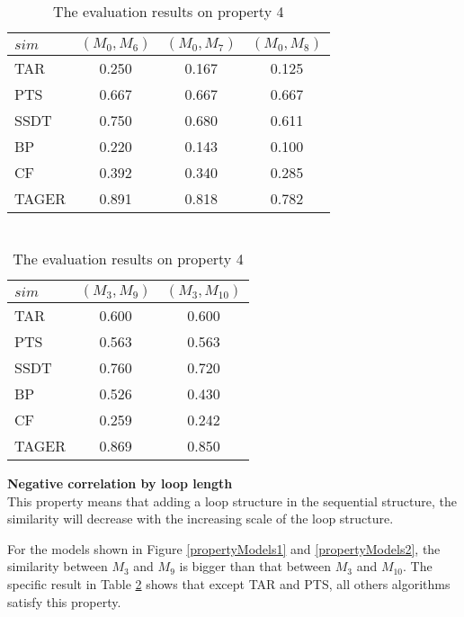 \documentclass{llncs}
\begin{document}
\begin{table}[!htb]
\begin{minipage}[t]{0.5\linewidth} 
\centering
\caption{ \protect\\ The evaluation results on property 3  \label{result_property3}}
\begin{tabular}{l c c c} \hline
 $sim$  & $(M_{0},M_{6})$ & $(M_{0},M_{7})$ & $(M_{0},M_{8})$ \\ \hline
 TAR & 0.250 & 0.167 & 0.125 \\ 
 PTS & 0.667 & 0.667 & 0.667 \\ 
 SSDT& 0.750 & 0.680 & 0.611 \\ 
 BP & 0.220 & 0.143 & 0.100 \\ 
 CF & 0.392 & 0.340 & 0.285\\ 
 TAGER& 0.891 & 0.818 & 0.782 \\ \hline
\end{tabular}
\end{minipage}
\begin{minipage}[t]{0.5\linewidth} 
\centering
\caption{ \protect\\ The evaluation results on property 4  \label{result_property4}}
\begin{tabular}{l c c} \hline
 $sim$  & $(M_{3},M_{9})$ & $(M_{3},M_{10})$  \\ \hline
 TAR & 0.600 & 0.600 \\ 
 PTS & 0.563 & 0.563  \\ 
 SSDT& 0.760 & 0.720 \\ 
 BP& 0.526 & 0.430 \\ 
 CF& 0.259 & 0.242 \\ 
 TAGER& 0.869 & 0.850 \\ \hline
\end{tabular}
\end{minipage}
\end{table}

\begin{property}
\textbf{Negative correlation by loop length}\\
This property means that adding a loop structure in the sequential structure, the similarity will decrease with the increasing scale of the loop structure.
\end{property}
For the models shown in Figure \ref{propertyModels1} and \ref{propertyModels2}, the similarity between $M_{3}$ and $M_{9}$ is bigger than that between $M_{3}$ and $M_{10}$. The specific result in Table \ref{result_property4} shows that except TAR and PTS, all others algorithms satisfy this property.
 
\end{document}
